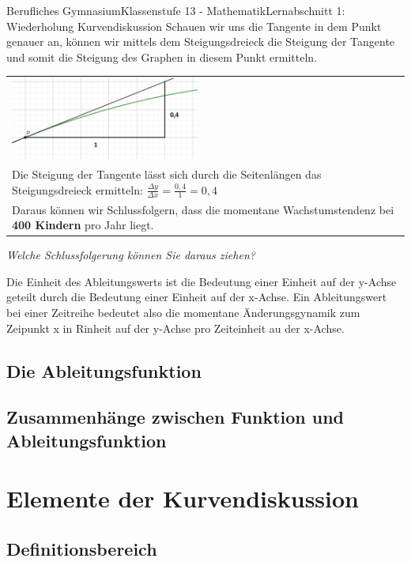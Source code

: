 \documentclass[11pt,twocolumn,oneside,openany,headings=optiontotoc,11pt,numbers=noenddot]{article}
\begin{document}
\begin{worksheet}{Berufliches Gymnasium}{Klassenstufe 13 - Mathematik}{Lernabschnitt 1: Wiederholung Kurvendiskussion}
		Schauen wir uns die Tangente in dem Punkt genauer an, können wir mittels dem Steigungsdreieck die Steigung der Tangente und somit die Steigung des Graphen in diesem Punkt ermitteln.\\
		\par\bigskip\noindent
		\begin{tabularx}{0.48\textwidth}{X}
			\includegraphics[width=0.48\textwidth]{../99_Bilder/KiTa2.png}\\
			Die Steigung der Tangente lässt sich durch die Seitenlängen das Steigungsdreieck ermitteln: \(\frac{\Delta{}y}{\Delta{}x}= \frac{0,4}{1} = 0,4\)\\
			Daraus können wir Schlussfolgern, dass die momentane Wachstumstendenz bei \textbf{400 Kindern} pro Jahr liegt.\\
		\end{tabularx}
		\par\bigskip\noindent
		\textit{Welche Schlussfolgerung können Sie daraus ziehen?}\\
		\par\bigskip\noindent
		\begin{framed}
			Die Einheit des Ableitungswerts ist die Bedeutung einer Einheit auf der y-Achse geteilt durch die Bedeutung einer Einheit auf der x-Achse. Ein Ableitungswert bei einer Zeitreihe bedeutet also die momentane Änderungsgynamik zum Zeipunkt x in \glqq{}Rinheit auf der y-Achse\grqq{} pro \glqq{}Zeiteinheit au der x-Achse\grqq{}.
		\end{framed}
		\subsection{Die Ableitungsfunktion}
		\subsection{Zusammenhänge zwischen Funktion und Ableitungsfunktion}
		\section{Elemente der Kurvendiskussion}
		\subsection{Definitionsbereich}

\end{worksheet}
\end{document}
